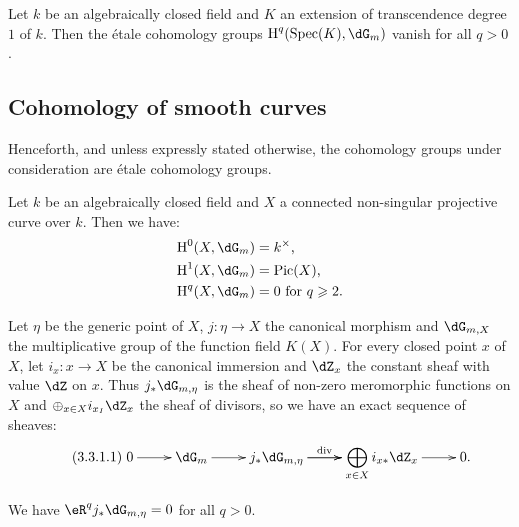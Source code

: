 \begin{corollary}\label{I:3-2-4}
  Let $k$ be an algebraically closed field and $K$ an extension of
transcendence degree $1$ of $k$. Then the \'etale cohomology groups
$\h^q(\spec(K),\dG_m)$ vanish for all $q>0$.
\end{corollary}










\subsection{Cohomology of smooth curves}

Henceforth, and unless expressly stated otherwise, the cohomology
groups under consideration are \'etale cohomology groups. 





\begin{proposition}\label{I:3-3-1}
Let $k$ be an algebraically closed field and $X$ a connected non-singular
projective curve over $k$. Then we have:
\begin{align*}
  \h^0(X,\dG_m) &= k^\times \text{,} \\
  \h^1(X,\dG_m) &= \pic(X) \text{,} \\
  \h^q(X,\dG_m) &= 0 \text{ for $q\geqslant 2$.}
\end{align*}
\end{proposition}

Let $\eta$ be the generic point of $X$, $j:\eta\to X$ the canonical
morphism and $\dG_{m,X}$ the multiplicative group of the function field
$K(X)$. For every closed point $x$ of $X$, let $i_x:x\to X$ be the canonical
immersion and $\dZ_x$ the constant sheaf with value $\dZ$ on $x$. Thus
$j_*\dG_{m,\eta}$ is the sheaf of non-zero meromorphic functions on
$X$ and $\oplus_{x\in X} i_{x_I}\dZ_x$ the sheaf of divisors, so we have an
exact sequence of sheaves:
\begin{equation*}\tag{3.3.1.1}\label{I:eq:3-3-1-1}
\xymatrix{
  0 \ar[r] 
    & \dG_m \ar[r]
    & j_* \dG_{m,\eta} \ar[r]^-{\dv} \ar[r] 
    & \displaystyle\bigoplus_{x\in X} i_{x*} \dZ_x \ar[r] 
    & 0\text{.}
}
\end{equation*}





\begin{lemma}\label{I:3-3-2}
We have $\eR^q j_* \dG_{m,\eta} = 0$ for all $q>0$.
\end{lemma}

